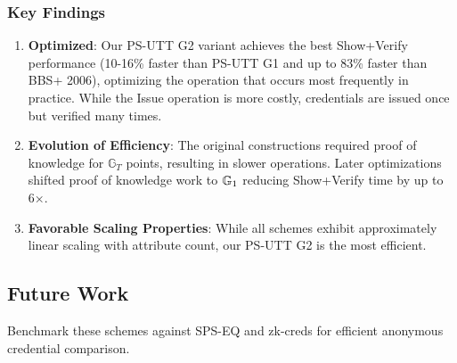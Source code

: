 \subsubsection{Key Findings}
\begin{enumerate}
    \item \textbf{Optimized}: Our PS-UTT G2 variant achieves the best Show+Verify performance (10-16\% faster than PS-UTT G1 and up to 83\% faster than BBS+ 2006), optimizing the operation that occurs most frequently in practice. While the Issue operation is more costly, credentials are issued once but verified many times.
    
    \item \textbf{Evolution of Efficiency}: The original constructions \cite{hutchison_constant-size_2006, sako_short_2016} required proof of knowledge for $\mathbb{G}_T$ points, resulting in slower operations. Later optimizations \cite{camenisch_anonymous_2016, tomescu_utt_2022} shifted proof of knowledge work to $\mathbb{G}_1$ reducing Show+Verify time by up to 6×.
    
    \item \textbf{Favorable Scaling Properties}: While all schemes exhibit approximately linear scaling with attribute count, our PS-UTT G2 is the most efficient.
\end{enumerate}




\subsection{Future Work}
Benchmark these schemes against SPS-EQ and zk-creds for efficient anonymous credential comparison.






























